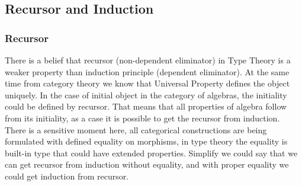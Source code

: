 \documentclass[11pt,oneside]{article}
\begin{document}







\newpage
\subsection{Recursor and Induction}
\subsubsection{Recursor}

There is a belief that recursor (non-dependent eliminator) in Type Theory
is a weaker property than induction principle (dependent eliminator). At the same time
from category theory we know that Universal Property defines the object uniquely.
In the case of initial object in the category of algebras, the initiality could be defined by recursor.
That means that all properties of algebra follow from its initiality,
as a case it is possible to get the recursor from induction. There is a sensitive moment here,
all categorical constructions are being formulated with defined equality on morphisms,
in type theory the equality is built-in type that could have extended properties. Simplify we could say
that we can get recursor from induction without equality, and with proper equality we could get induction from recursor.
\end{document}
